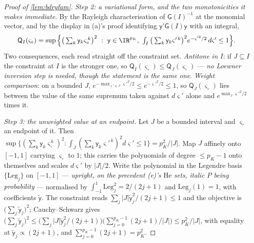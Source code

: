 \begin{proof}[Proof of \cref{lem:bdryfam}]
\emph{Step 2: a variational form, and the two monotonicities it makes immediate.} By the Rayleigh
characterisation of $\mathsf G(I)^{-1}$ at the monomial vector, and by the display in (a)'s proof
identifying $\mathsf y'\mathsf G(I)\mathsf y$ with an integral,
\begin{equation*}
\mathsf Q_I(\varsigma_\circ)
=\sup\Big\{\big(\textstyle\sum_k\mathsf y_k\varsigma_\circ^{\,k}\big)^{2}\ :\
\mathsf y\in\IR^{p_K},\ \int_I\big(\textstyle\sum_k\mathsf y_k\varsigma'^{\,k}\big)^{2}
e^{-\varsigma'^{2}/2}\,d\varsigma'\le1\Big\} .
\end{equation*}
Two consequences, each read straight off the constraint set. \emph{Antitone in $I$}: if $J\subseteq I$
the constraint at $I$ is the stronger one, so $\mathsf Q_I(\varsigma_\circ)\le\mathsf Q_J(\varsigma_\circ)$
--- \emph{no Loewner inversion step is needed, though the statement is the same one}. \emph{Weight
comparison}: on a bounded $J$, $e^{-\max_{\varsigma'\in J}\varsigma'^{2}/2}\le e^{-\varsigma'^{2}/2}\le1$,
so $\mathsf Q_J(\varsigma_\circ)$ lies between the value of the same supremum taken against
$d\varsigma'$ alone and $e^{\max_{J}\varsigma'^{2}/2}$ times it.

\emph{Step 3: the unweighted value at an endpoint.} Let $J$ be a bounded interval and $\varsigma_\circ$
an endpoint of it. Then
$\sup\{(\sum_k\mathsf y_k\varsigma_\circ^{\,k})^{2}:\int_J(\sum_k\mathsf y_k\varsigma'^{\,k})^{2}
d\varsigma'\le1\}=p_K^{2}/|J|$. Map $J$ affinely onto $[-1,1]$ carrying $\varsigma_\circ$ to $1$; this
carries the polynomials of degree $\le p_K-1$ onto themselves and scales $d\varsigma'$ by $|J|/2$. Write
the polynomial in the Legendre basis $\{\mathrm{Leg}_j\}$ on $[-1,1]$ --- \emph{upright, on the precedent
\textup{(e)}'s $\mathrm{He}$ sets, italic $P$ being probability} --- normalised by
$\int_{-1}^{1}\mathrm{Leg}_j^{2}=2/(2j+1)$ and $\mathrm{Leg}_j(1)=1$, with coefficients
$\tilde{\mathsf y}$. The constraint reads $\sum_j|J|\tilde{\mathsf y}_j^{2}/(2j+1)\le1$ and the objective
is $\big(\sum_j\tilde{\mathsf y}_j\big)^{2}$; Cauchy--Schwarz gives
$\big(\sum_j\tilde{\mathsf y}_j\big)^{2}\le\big(\sum_j|J|\tilde{\mathsf y}_j^{2}/(2j+1)\big)
\big(\sum_{j=0}^{p_K-1}(2j+1)/|J|\big)\le p_K^{2}/|J|$, with equality at
$\tilde{\mathsf y}_j\propto(2j+1)$, and $\sum_{j=0}^{p_K-1}(2j+1)=p_K^{2}$.


\end{proof}
